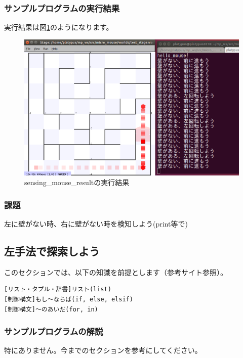 \documentclass[11pt,a4paper]{jsarticle}
\begin{document}
\subsubsection{サンプルプログラムの実行結果}
実行結果は図\ref{sensing_mouse_result}のようになります。
\begin{figure}[h]
  \begin{center}
    \includegraphics[width=128mm]{./sensing_mouse_result.png}
  \end{center}
  \label{sensing_mouse_result}
  \caption{sensing\_mouse\_resultの実行結果}
\end{figure}

\subsubsection{課題}
左に壁がない時、右に壁がない時を検知しよう(print等で)



\newpage
\subsection{左手法で探索しよう}
このセクションでは、以下の知識を前提とします（参考サイト参照）。
\begin{lstlisting}[frame=single]
[リスト・タプル・辞書]リスト(list)
[制御構文]もし～ならば(if, else, elsif)
[制御構文]～のあいだ(for, in)
\end{lstlisting}

\subsubsection{サンプルプログラムの解説}
特にありません。今までのセクションを参考にしてください。

\end{document}
